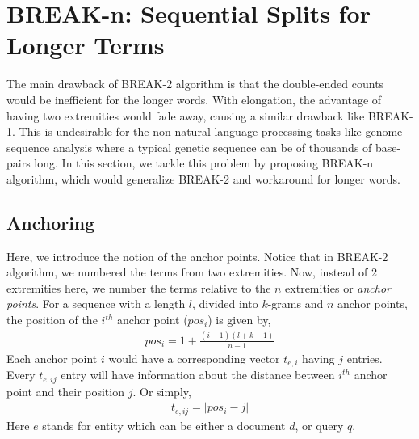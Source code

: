 \section{BREAK-n: Sequential Splits for Longer Terms}

The main drawback of BREAK-2 algorithm is that the double-ended counts would be inefficient for the longer words. 
With elongation, the advantage of having two extremities would fade away, causing a similar drawback like BREAK-1.
This is undesirable for the non-natural language processing tasks like genome sequence analysis where a typical genetic sequence can be of thousands of base-pairs long.
In this section, we tackle this problem by proposing BREAK-n algorithm, which would generalize BREAK-2 and workaround for longer words.
\subsection{Anchoring}
Here, we introduce the notion of the anchor points.
Notice that in BREAK-2 algorithm, we numbered the terms from two extremities.
Now, instead of 2 extremities here, we number the terms relative to the $n$ extremities or \textit{anchor points}.
For a sequence with a length $l$, divided into $k$-grams and $n$ anchor points, the position of the $i^{th}$ anchor point ($pos_i$) is given by,
\begin{align}
	\label{anchor}
	pos_i = 1 + \frac{(i - 1)(l + k - 1)}{n - 1}
\end{align}
Each anchor point $i$ would have a corresponding vector $t_{e,i}$ having $j$ entries.
Every $t_{e, ij}$ entry will have information about the distance between $i^{th}$ anchor point and their position $j$.
Or simply,
\begin{align}
	\label{relative}
	t_{e, ij} = |pos_i - j|
\end{align}
Here $e$ stands for entity which can be either a document $d$, or query $q$.

